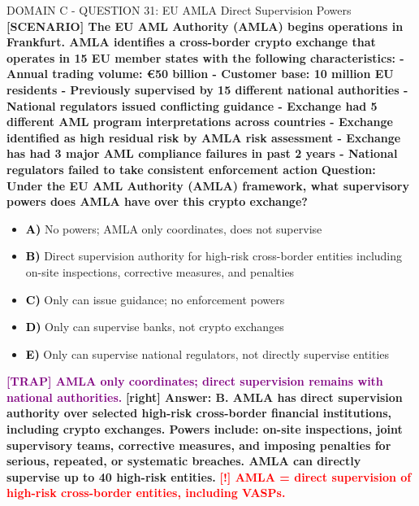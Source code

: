 \documentclass[11pt,a4paper]{beamer}
\newcommand{\redflag}[1]{\textcolor{red}{\textbf{[!] #1}}}
\newcommand{\trap}[1]{\textcolor{purple}{\textbf{[TRAP] #1}}}
\newcommand{\correct}[1]{\textcolor{green!50!black}{\textbf{[right] #1}}}
\newcommand{\scenario}[1]{\textcolor{blue!70!black}{\textbf{[SCENARIO] #1}}}
\newcommand{\option}[1]{\textcolor{black}{\textbf{#1}}}
\begin{document}
\begin{frame}{DOMAIN C - QUESTION 31: EU AMLA Direct Supervision Powers}
\scenario{The EU AML Authority (AMLA) begins operations in Frankfurt. AMLA identifies a cross-border crypto exchange that operates in 15 EU member states with the following characteristics:
- Annual trading volume: €50 billion
- Customer base: 10 million EU residents
- Previously supervised by 15 different national authorities
- National regulators issued conflicting guidance
- Exchange had 5 different AML program interpretations across countries
- Exchange identified as high residual risk by AMLA risk assessment
- Exchange has had 3 major AML compliance failures in past 2 years
- National regulators failed to take consistent enforcement action}
\vspace{0.2cm}
\textbf{Question: Under the EU AML Authority (AMLA) framework, what supervisory powers does AMLA have over this crypto exchange?}
\vspace{0.1cm}
\begin{itemize}
    \item \option{A)} No powers; AMLA only coordinates, does not supervise
    \item \option{B)} Direct supervision authority for high-risk cross-border entities including on-site inspections, corrective measures, and penalties
    \item \option{C)} Only can issue guidance; no enforcement powers
    \item \option{D)} Only can supervise banks, not crypto exchanges
    \item \option{E)} Only can supervise national regulators, not directly supervise entities
\end{itemize}
\vspace{0.2cm}
\trap{AMLA only coordinates; direct supervision remains with national authorities.}
\correct{Answer: B. AMLA has direct supervision authority over selected high-risk cross-border financial institutions, including crypto exchanges. Powers include: on-site inspections, joint supervisory teams, corrective measures, and imposing penalties for serious, repeated, or systematic breaches. AMLA can directly supervise up to 40 high-risk entities.}
\redflag{AMLA = direct supervision of high-risk cross-border entities, including VASPs.}
\end{frame}
\end{document}
